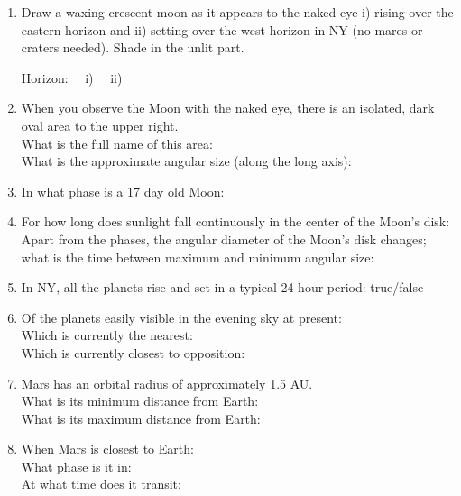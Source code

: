 \documentclass[11pt]{article}
\begin{document}
\begin{enumerate}
\vskip 1.0cm
\item
Draw a waxing crescent moon as it appears to the naked eye i) rising over
the eastern horizon and ii) setting over the west horizon in NY (no mares or craters needed). Shade in the unlit part.

\vskip 1.0cm
 Horizon: \ \ i) \makebox[3cm]{\hrulefill} \ \ ii) \makebox[3cm]{\hrulefill} 

\vskip 1.0cm
\item
When you observe the Moon with the naked eye, there is an isolated,
dark oval area to the upper right. \\
What is the full name of this area: \\
What is the approximate angular size (along the long axis):

\vskip 1.0cm
\item
In what phase is a 17 day old Moon:

\vskip 1.0cm
\item
For how long does sunlight fall continuously in the center of the
Moon's disk: \\
Apart from the phases, the angular diameter of the Moon's disk changes; what is
the time between maximum and minimum angular size:

\vskip 1.0cm
\item 
In NY, all the planets rise and set in a typical 24 hour period: true/false



\vskip 1.0cm
\item
Of the planets easily visible in the evening sky at present:
\\ Which is currently the nearest:
\\ Which is currently closest to opposition:
 
\vskip 1.0cm
\item
Mars has an orbital radius of approximately 1.5 AU. \\
What is its minimum distance from Earth: \\
What is its maximum distance from Earth:


\vskip 1.0cm
\item 
When Mars is closest to Earth: \\
What phase is it in:   \\
At what time does it transit:



\end{enumerate}
\end{document}
